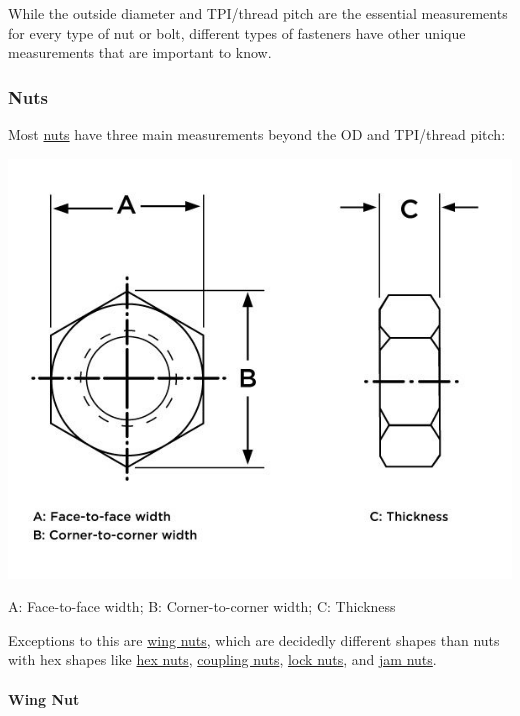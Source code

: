 \documentclass[english,]{article}
\let\oldparagraph\paragraph
\renewcommand{\paragraph}[1]{\oldparagraph{#1}\mbox{}}
\begin{document}
\hypertarget{i7aa4wx}{}
While the outside diameter and TPI/thread pitch are the essential
measurements for every type of nut or bolt, different types of fasteners
have other unique measurements that are important to know.

\hypertarget{ifa94lv}{%
\subsubsection{Nuts}\label{ifa94lv}}

\hypertarget{if13qfk}{}
Most \href{https://www.huyett.com/all-products/nuts}{nuts} have three
main measurements beyond the OD and TPI/thread pitch:

\includegraphics{Introduction to Nut and Bolt Sizes_files/6307bb72dbb49891453363.jpg}

\hypertarget{ijs7afj}{}
A: Face-to-face width; B: Corner-to-corner width; C: Thickness

\hypertarget{isfuo09}{}
Exceptions to this are
\href{https://www.huyett.com/all-products/nuts/wing-nuts}{wing nuts},
which are decidedly different shapes than nuts with hex shapes like
\href{https://www.huyett.com/all-products/nuts/hex-nuts}{hex nuts},
\href{https://www.huyett.com/all-products/nuts/coupling-nuts}{coupling
nuts}, \href{https://www.huyett.com/all-products/nuts/lock-nuts}{lock
nuts}, and
\href{https://www.huyett.com/all-products/nuts/lock-nuts/jam-lock-nuts}{jam
nuts}.

\hypertarget{ipyz34t}{%
\paragraph{Wing Nut}\label{ipyz34t}}
\end{document}
